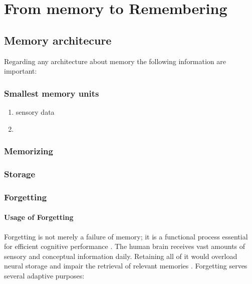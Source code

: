 \chapter{From memory to Remembering}

\section{Memory architecure}
Regarding any architecture about memory the following information are important:

    \subsection{Smallest memory units}
        \begin{enumerate}
            \item sensory data
            \item
        \end{enumerate}
    \subsection{Memorizing}

    \subsection{Storage}

    \subsection{Forgetting}
        \subsubsection{Usage of Forgetting}
        Forgetting is not merely a failure of memory; it is a functional process essential for efficient cognitive performance \cite{hardt-2013-decay-happens}.
        The human brain receives vast amounts of sensory and conceptual information daily.
        Retaining all of it would overload neural storage and impair the retrieval of relevant memories .
        Forgetting serves several adaptive purposes:

